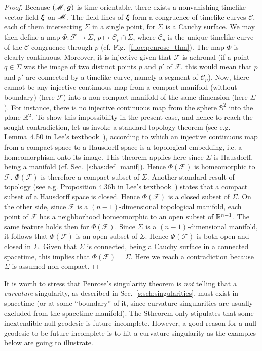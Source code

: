 \begin{proof}
Because $(\mathscr{M},\bm{g})$ is time-orientable, there exists a nonvanishing
timelike vector field $\bm{\xi}$ on $\mathscr{M}$. The field lines of $\bm{\xi}$
form a congruence of timelike curves $\mathscr{C}$, each of them intersecting
$\Sigma$ in a single point, for $\Sigma$ is a Cauchy surface.
We may then define a map $\Phi: \mathscr{F} \to \Sigma$,
$p \mapsto \mathscr{C}_p \cap \Sigma$, where $\mathscr{C}_p$ is the unique
timelike curve of the $\mathscr{C}$ congruence through $p$ (cf. Fig.~\ref{f:loc:penrose_thm}).
The map $\Phi$ is clearly continuous. Moreover, it is injective given that
$\mathscr{F}$ is achronal (if a point $q\in\Sigma$ was the image of two distinct
points $p$ and $p'$ of $\mathscr{F}$, this would mean that $p$ and $p'$
are connected by a timelike curve, namely a segment of $\mathscr{C}_p$).
Now, there cannot be any injective continuous map from a
compact manifold (without boundary) (here $\mathscr{F}$)
into a non-compact manifold of the same dimension (here $\Sigma$). For instance,
there is no injective continuous map from the sphere $\mathbb{S}^2$ into
the plane $\mathbb{R}^2$. To show this impossibility in the present case, and hence
to reach the sought contradiction, let us invoke a
standard topology theorem (see e.g. Lemma~4.50
in Lee's textbook~\cite{Lee11}), according to which an injective continuous map
from a compact space to a Hausdorff space
is a topological embedding, i.e. a homeomorphism onto its image. This theorem applies here
since $\Sigma$ is Hausdorff, being a manifold (cf. Sec.~\ref{s:bas:def_manif}).
Hence $\Phi(\mathscr{F})$ is homeomorphic to $\mathscr{F}$.
$\Phi(\mathscr{F})$ is therefore a compact subset of $\Sigma$.
Another standard result of topology (see e.g. Proposition 4.36b in Lee's textbook~\cite{Lee11})
states that a compact subset of a Hausdorff space is closed. Hence $\Phi(\mathscr{F})$
is a closed subset of $\Sigma$.
On the other side, since $\mathscr{F}$ is a $(n-1)$-dimensional topological manifold,
each point of $\mathscr{F}$
has a neighborhood homeomorphic to an open subset of $\mathbb{R}^{n-1}$. The same feature holds then for
$\Phi(\mathscr{F})$. Since $\Sigma$ is a $(n-1)$-dimensional manifold, it follows that
$\Phi(\mathscr{F})$ is an open subset of $\Sigma$. Hence $\Phi(\mathscr{F})$ is both open
and closed in $\Sigma$. Given that $\Sigma$ is connected, being a Cauchy surface in
a connected spacetime, this implies that
$\Phi(\mathscr{F}) = \Sigma$. Here we reach a contradiction because $\Sigma$
is assumed non-compact.
\end{proof}

It is worth to stress that Penrose's singularity theorem is \emph{not}
telling that a \emph{curvature} singularity, as described in Sec.~\ref{s:sch:singularities},
must exist in spacetime (or at some ``boundary'' of it, since
curvature singularities are usually excluded from the spacetime manifold).
The Stheorem only stipulates that some inextendible null geodesic is future-incomplete. However,
a good reason for a null geodesic to be future-incomplete is to hit a curvature singularity
as the examples below are going to illustrate.

